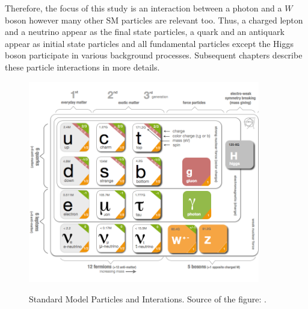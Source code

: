 Therefore, the focus of this study is an interaction between a photon and a $W$ boson however many other SM particles are relevant too. Thus, a charged lepton and a neutrino appear as the final state particles, a quark and an antiquark appear as initial state particles and all fundamental particles except the Higgs boson participate in various background processes. Subsequent chapters describe these particle interactions in more details.


\begin{figure}[htb]
  \begin{center}
    {\includegraphics[width=0.90\textwidth]{../figs/Intro/StandardModel.png}}
    \caption{Standard Model Particles and Interations. Source of the figure: \cite{ref_fig_SM}.}
    \label{fig:SMtable}
  \end{center}
\end{figure}





